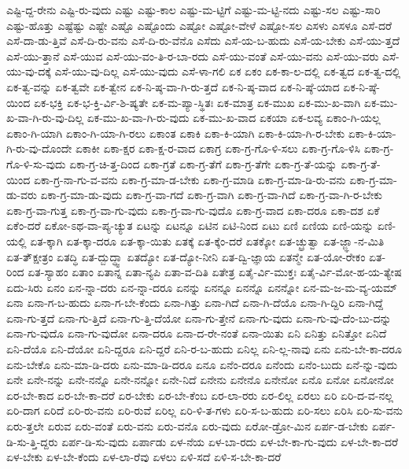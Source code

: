 {ಎಷ್ಟಿ-ದ್ದ-ರೇನು
ಎಷ್ಟಿ-ರು-ವುದು
ಎಷ್ಟು
ಎಷ್ಟು-ಕಾಲ
ಎಷ್ಟು-ಮ-ಟ್ಟಿಗೆ
ಎಷ್ಟು-ಮ-ಟ್ಟಿ-ನದು
ಎಷ್ಟು-ಸಲ
ಎಷ್ಟು-ಸಾರಿ
ಎಷ್ಟು-ಹೊತ್ತು
ಎಷ್ಟೆಷ್ಟು
ಎಷ್ಟೇ
ಎಷ್ಟೊ
ಎಷ್ಟೊಂದು
ಎಷ್ಟೋ
ಎಷ್ಟೋ-ವೇಳೆ
ಎಷ್ಟೋ-ಸಲ
ಎಸಳು
ಎಸಳೂ
ಎಸೆ-ದರೆ
ಎಸೆ-ದಾ-ಡು-ತ್ತಿವೆ
ಎಸೆ-ದಿ-ರು-ವನು
ಎಸೆ-ದಿ-ರು-ವೆನೊ
ಎಸೆದು
ಎಸೆ-ಯ-ಬ-ಹುದು
ಎಸೆ-ಯ-ಬೇಕು
ಎಸೆ-ಯು-ತ್ತದೆ
ಎಸೆ-ಯು-ತ್ತಾನೆ
ಎಸೆ-ಯುವ
ಎಸೆ-ಯು-ವಂ-ತಿ-ರ-ಬಾ-ರದು
ಎಸೆ-ಯು-ವಂತೆ
ಎಸೆ-ಯು-ವನು
ಎಸೆ-ಯು-ವರು
ಎಸೆ-ಯು-ವು-ದಕ್ಕೆ
ಎಸೆ-ಯು-ವು-ದಿಲ್ಲ
ಎಸೆ-ಯು-ವುದು
ಎಸೆ-ಳಾ-ಗಲಿ
ಏಕ
ಏಕಂ
ಏಕ-ಕಾ-ಲ-ದಲ್ಲಿ
ಏಕ-ತ್ವದ
ಏಕ-ತ್ವ-ದಲ್ಲಿ
ಏಕ-ತ್ವ-ವನ್ನು
ಏಕ-ತ್ವವೇ
ಏಕ-ತ್ವೇನ
ಏಕ-ನಿ-ಷ್ಠ-ವಾ-ಗಿ-ರು-ತ್ತದೆ
ಏಕ-ನಿ-ಷ್ಠ-ವಾದ
ಏಕ-ನಿ-ಷ್ಠೆ-ಯಾದ
ಏಕ-ನಿ-ಷ್ಠೆ-ಯಿಂದ
ಏಕ-ಭಕ್ತಿ
ಏಕ-ಭ-ಕ್ತಿ-ರ್ವಿ-ಶಿ-ಷ್ಯತೇ
ಏಕ-ಮ-ಪ್ಯಾ-ಸ್ಥಿತಃ
ಏಕ-ಮಾತ್ರ
ಏಕ-ಮುಖ
ಏಕ-ಮು-ಖ-ವಾಗಿ
ಏಕ-ಮು-ಖ-ವಾ-ಗಿ-ರು-ವು-ದಿಲ್ಲ
ಏಕ-ಮು-ಖ-ವಾ-ಗಿ-ರು-ವುದು
ಏಕ-ಮು-ಖ-ವಾದ
ಏಕಯಾ
ಏಕ-ಲವ್ಯ
ಏಕಾಂ-ಗಿ-ಯಲ್ಲ
ಏಕಾಂ-ಗಿ-ಯಾಗಿ
ಏಕಾಂ-ಗಿ-ಯಾ-ಗಿ-ರಲು
ಏಕಾಂತ
ಏಕಾಕಿ
ಏಕಾ-ಕಿ-ಯಾಗಿ
ಏಕಾ-ಕಿ-ಯಾ-ಗಿ-ರ-ಬೇಕು
ಏಕಾ-ಕಿ-ಯಾ-ಗಿ-ರು-ವು-ದೊಂದೇ
ಏಕಾಕೀ
ಏಕಾ-ಕ್ಷರ
ಏಕಾ-ಕ್ಷ-ರ-ವಾದ
ಏಕಾಗ್ರ
ಏಕಾ-ಗ್ರ-ಗೊ-ಳಿ-ಸಲು
ಏಕಾ-ಗ್ರ-ಗೊ-ಳಿಸಿ
ಏಕಾ-ಗ್ರ-ಗೊ-ಳಿ-ಸು-ವುದು
ಏಕಾ-ಗ್ರ-ಚಿ-ತ್ತ-ದಿಂದ
ಏಕಾ-ಗ್ರತೆ
ಏಕಾ-ಗ್ರ-ತೆಗೆ
ಏಕಾ-ಗ್ರ-ತೆಗೇ
ಏಕಾ-ಗ್ರ-ತೆ-ಯನ್ನು
ಏಕಾ-ಗ್ರ-ತೆ-ಯಿಂದ
ಏಕಾ-ಗ್ರ-ನಾ-ಗು-ವ-ವನು
ಏಕಾ-ಗ್ರ-ಮಾ-ಡ-ಬೇಕು
ಏಕಾ-ಗ್ರ-ಮಾಡಿ
ಏಕಾ-ಗ್ರ-ಮಾ-ಡಿ-ರು-ವನು
ಏಕಾ-ಗ್ರ-ಮಾ-ಡು-ವರು
ಏಕಾ-ಗ್ರ-ಮಾ-ಡು-ವುದು
ಏಕಾ-ಗ್ರ-ವಾ-ಗದೆ
ಏಕಾ-ಗ್ರ-ವಾಗಿ
ಏಕಾ-ಗ್ರ-ವಾ-ಗಿದೆ
ಏಕಾ-ಗ್ರ-ವಾ-ಗಿ-ರ-ಬೇಕು
ಏಕಾ-ಗ್ರ-ವಾ-ಗುತ್ತ
ಏಕಾ-ಗ್ರ-ವಾ-ಗು-ವುದು
ಏಕಾ-ಗ್ರ-ವಾ-ಗು-ವುದೊ
ಏಕಾ-ಗ್ರ-ವಾದ
ಏಕಾ-ದರೂ
ಏಕಾ-ದಶ
ಏಕೆ
ಏಕೆಂ-ದರೆ
ಏಕೋ-ಽಥ-ವಾ-ಪ್ಯ-ಚ್ಯುತ
ಏಟನ್ನು
ಏಟನ್ನೂ
ಏಟಿನ
ಏಟಿ-ನಿಂದ
ಏಟು
ಏಣಿ
ಏಣಿಯ
ಏಣಿ-ಯನ್ನು
ಏಣಿ-ಯಲ್ಲಿ
ಏತ-ಕ್ಕಾಗಿ
ಏತ-ಕ್ಕಾ-ದರೂ
ಏತ-ಕ್ಕಾ-ಯಿತು
ಏತಕ್ಕೆ
ಏತ-ಕ್ಕೆಂ-ದರೆ
ಏತಕ್ಕೋ
ಏತ-ಚ್ಛ್ರುತ್ವಾ
ಏತ-ಜ್ಜ್ಞಾ-ನ-ಮಿತಿ
ಏತ-ತ್ಕ್ಷೇತ್ರಂ
ಏತದ್ಧಿ
ಏತ-ದ್ಬುದ್ಧ್ವಾ
ಏತದ್ಯೋ
ಏತ-ದ್ಯೋ-ನೀನಿ
ಏತ-ದ್ವಿ-ಜ್ಞಾಯ
ಏತನ್ಮೇ
ಏತ-ಯೋ-ರೇಕಂ
ಏತ-ರಿಂದ
ಏತ-ಸ್ಯಾಹಂ
ಏತಾಂ
ಏತಾನ್ನ
ಏತಾ-ನ್ಯಪಿ
ಏತಾ-ವ-ದಿತಿ
ಏತೇತ್ರ
ಏತೈ-ರ್ವಿ-ಮುಕ್ತಃ
ಏತೈ-ರ್ವಿ-ಮೋ-ಹ-ಯ-ತ್ಯೇಷ
ಏದು-ಸಿರು
ಏನಂ
ಏನ-ನ್ನಾ-ದರು
ಏನ-ನ್ನಾ-ದರೂ
ಏನನ್ನು
ಏನನ್ನೂ
ಏನನ್ನೊ
ಏನನ್ನೋ
ಏನ-ಮ-ಜ-ಮ-ವ್ಯ-ಯಮ್
ಏನಾ
ಏನಾ-ಗ-ಬ-ಹುದು
ಏನಾ-ಗ-ಬೇ-ಕೆಂದು
ಏನಾ-ಗಿತ್ತು
ಏನಾ-ಗಿದೆ
ಏನಾ-ಗಿ-ದೆಯೊ
ಏನಾ-ಗಿ-ದ್ದಿರಿ
ಏನಾ-ಗಿದ್ದೆ
ಏನಾ-ಗು-ತ್ತದೆ
ಏನಾ-ಗು-ತ್ತಿದೆ
ಏನಾ-ಗು-ತ್ತಿ-ದೆಯೋ
ಏನಾ-ಗು-ತ್ತೇನೆ
ಏನಾ-ಗು-ವುದು
ಏನಾ-ಗು-ವು-ದೆಂ-ಬು-ದನ್ನು
ಏನಾ-ಗು-ವುದೊ
ಏನಾ-ಗು-ವುದೋ
ಏನಾ-ದರೂ
ಏನಾ-ದ-ರೇ-ನಂತೆ
ಏನಾ-ಯಿತು
ಏನಿ
ಏನಿತ್ತು
ಏನಿತ್ತೋ
ಏನಿದೆ
ಏನಿ-ದೆಯೊ
ಏನಿ-ದೆಯೋ
ಏನಿ-ದ್ದರೂ
ಏನಿ-ದ್ದರೆ
ಏನಿ-ರ-ಬ-ಹುದು
ಏನಿಲ್ಲ
ಏನಿ-ಲ್ಲ-ನಾವು
ಏನು
ಏನು-ಬೇ-ಕಾ-ದರೂ
ಏನು-ಬೇಕೊ
ಏನು-ಮಾ-ಡಿ-ದರು
ಏನು-ಮಾ-ಡಿ-ದರೂ
ಏನೂ
ಏನೆಂ-ದರೂ
ಏನೆಂದು
ಏನೆಂ-ಬುದು
ಏನೆ-ನ್ನು-ವುದು
ಏನೇ
ಏನೇ-ನನ್ನು
ಏನೇ-ನನ್ನೊ
ಏನೇ-ನನ್ನೋ
ಏನೇ-ನಿದೆ
ಏನೇನು
ಏನೇನೊ
ಏನೇನೋ
ಏನೊ
ಏನೋ
ಏನೋನೋ
ಏರ-ಬೇ-ಕಾದ
ಏರ-ಬೇ-ಕಾ-ದರೆ
ಏರ-ಬೇಕು
ಏರ-ಬೇ-ಕೆಂಬ
ಏರ-ಲಾ-ರರು
ಏರ-ಲಿಲ್ಲ
ಏರಲು
ಏರಿ
ಏರಿ-ದ-ವ-ನಲ್ಲ
ಏರಿ-ದಾಗ
ಏರಿದೆ
ಏರಿ-ರು-ವನು
ಏರಿ-ರುವೆ
ಏರಿಲ್ಲ
ಏರಿ-ಳಿ-ತ-ಗಳು
ಏರಿ-ಸ-ಬ-ಹುದು
ಏರಿ-ಸಲು
ಏರಿಸಿ
ಏರಿ-ಸು-ವನು
ಏರು-ತ್ತಲೇ
ಏರುವ
ಏರು-ವಂತೆ
ಏರು-ವನು
ಏರು-ವನೊ
ಏರು-ವುದು
ಏರೋ-ಡ್ರೋ-ಮಿನ
ಏರ್ಪ-ಡ-ಬೇಕು
ಏರ್ಪ-ಡಿ-ಸು-ತ್ತಿ-ದ್ದರು
ಏರ್ಪ-ಡಿ-ಸು-ವುದು
ಏರ್ಪಾಡು
ಏಳ-ನೆಯ
ಏಳ-ಬಾ-ರದು
ಏಳ-ಬೇ-ಕಾ-ಗು-ವುದು
ಏಳ-ಬೇ-ಕಾ-ದರೆ
ಏಳ-ಬೇಕು
ಏಳ-ಬೇ-ಕೆಂದು
ಏಳ-ಲಾ-ರೆವು
ಏಳಲು
ಏಳಿ-ಸದೆ
ಏಳಿ-ಸ-ಬೇ-ಕಾ-ದರೆ
}
